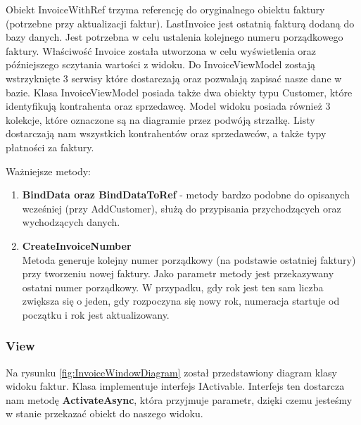 Obiekt InvoiceWithRef trzyma referencję do oryginalnego obiektu faktury (potrzebne przy aktualizacji faktur). LastInvoice jest ostatnią fakturą dodaną do bazy danych. Jest potrzebna w celu ustalenia kolejnego numeru porządkowego faktury. Właściwość Invoice została utworzona w celu wyświetlenia oraz późniejszego sczytania wartości z widoku. Do InvoiceViewModel zostają wstrzyknięte 3 serwisy które dostarczają oraz pozwalają zapisać nasze dane w bazie. Klasa InvoiceViewModel posiada także dwa obiekty typu Customer, które identyfikują kontrahenta oraz sprzedawcę. Model widoku posiada również 3 kolekcje, które oznaczone są na diagramie przez podwóją strzałkę. Listy dostarczają nam wszystkich kontrahentów oraz sprzedawców, a także typy płatności za faktury.

Ważniejsze metody:
\begin{enumerate}
    \item \textbf{BindData oraz BindDataToRef} - metody bardzo podobne do opisanych wcześniej (przy AddCustomer), służą do przypisania przychodzących oraz wychodzących danych.
    \item \textbf{CreateInvoiceNumber} \\
    Metoda generuje kolejny numer porządkowy (na podstawie ostatniej faktury) przy tworzeniu nowej faktury. Jako parametr metody jest przekazywany ostatni numer porządkowy. W przypadku, gdy rok jest ten sam liczba zwiększa się o jeden, gdy rozpoczyna się nowy rok, numeracja startuje od początku i rok jest aktualizowany.
\end{enumerate}

\subsubsection{View}
Na rysunku \ref{fig:InvoiceWindowDiagram} został przedstawiony diagram klasy widoku faktur. Klasa implementuje interfejs IActivable. Interfejs ten dostarcza nam metodę \textbf{ActivateAsync}, która przyjmuje parametr, dzięki czemu jesteśmy w stanie przekazać obiekt do naszego widoku.

